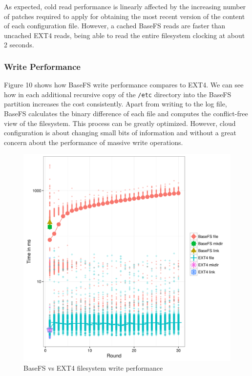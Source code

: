 \documentclass{sig-alternate}
\begin{document}
As expected, cold read performance is linearly affected by the increasing number of patches required to apply for obtaining the most recent version of the content of each configuration file. However, a cached BaseFS reads are faster than uncached EXT4 reads, being able to read the entire filesystem clocking at about 2 seconds.

\subsubsection{Write Performance}


Figure 10 shows how BaseFS write performance compares to EXT4. We can see how in each additional recursive copy of the \texttt{/etc} directory into the BaseFS partition increases the cost consistently. Apart from writing to the log file, BaseFS calculates the binary difference of each file and computes the conflict-free view of the filesystem. This process can be greatly optimized. However, cloud configuration is about changing small bits of information and without a great concern about the performance of massive write operations.


\begin{figure}
\centering
\includegraphics[width=\columnwidth]{imgs/write_performance.png}
\caption{BaseFS vs EXT4 filesystem write performance}
\label{fig:write-performance}
\end{figure}
\end{document}
